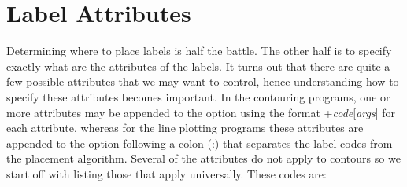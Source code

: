 \section{Label Attributes}
Determining where to place labels is half the battle.  The other half is to specify exactly
what are the attributes of the labels.  It turns out that there are quite a few possible
attributes that we may want to control, hence understanding how to specify these attributes
becomes important.  In the contouring programs, one or more attributes may be appended to the
 option using the format +{\it code}[{\it args}] for each attribute, whereas for the line
plotting programs these attributes are appended to the  option following a colon (:)
that separates the label codes from the placement algorithm.  Several of the attributes do not
apply to contours so we start off with listing those that apply universally.  These codes are:
